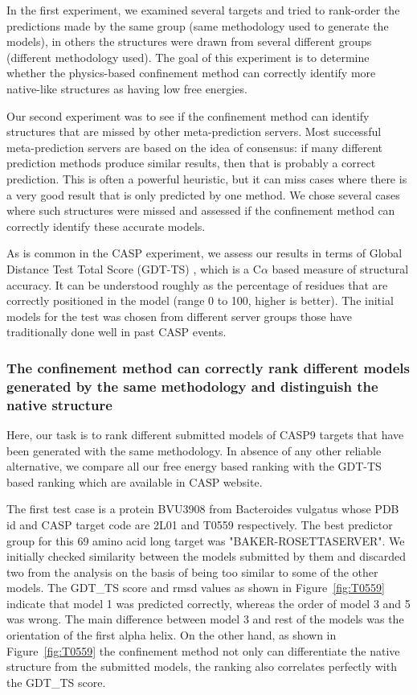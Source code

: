 \documentclass[12pt]{article}
\begin{document}
In the first experiment, we examined several targets and tried to rank-order the predictions
made by the same group (same methodology used to generate the models), in others the
structures were drawn from several different groups (different methodology used). The goal of this 
experiment is to determine whether 
the physics-based confinement method can correctly identify more native-like structures as having
low free energies.

Our second experiment was to see if the confinement method can identify structures that are missed
by other meta-prediction servers. Most successful meta-prediction servers are based on the idea of
consensus: if many different prediction methods produce similar results, then that is probably a
correct prediction. This is often a powerful heuristic, but it can miss cases where there is a very
good result that is only predicted by one method. We chose several cases where such structures were
missed and assessed if the confinement method can correctly identify these accurate models.

As is common in the CASP experiment, we assess our results in terms of Global Distance Test Total
Score (GDT-TS) \cite{Zemla2003}, which is a C$\alpha$ based measure of structural accuracy. It can
be understood roughly as the percentage of residues that are correctly positioned in the model
(range 0 to 100, higher is better). The initial models for the test was chosen from different server 
groups those have traditionally done well in past CASP events.

\subsubsection{The confinement method can correctly rank different models generated by the same methodology
and distinguish the native structure}

Here, our task is to rank different submitted models of CASP9 targets that have been generated with
the same methodology. In absence of any other reliable alternative, we compare all our free energy based 
ranking with the GDT-TS based ranking which are available in CASP website.  

The first test case is a protein BVU3908 from Bacteroides vulgatus whose PDB id and CASP target 
code are 2L01 and T0559 respectively.
The best predictor group for this 69 amino acid long target was "BAKER-ROSETTASERVER". We initially checked similarity
between the models submitted by them and discarded two from the analysis on
the basis of being too similar to some of the other models. The GDT\_TS score and rmsd values as
shown in Figure~\ref{fig:T0559} indicate that model 1 was predicted correctly, whereas the order of
model 3 and 5 was wrong. The main difference between model 3 and rest of the models was the  
orientation of the first alpha helix. On the other hand, as shown
in Figure~\ref{fig:T0559} the confinement method not only can differentiate the native
structure from the submitted models, the ranking also correlates perfectly with the GDT\_TS score.  
\end{document}
